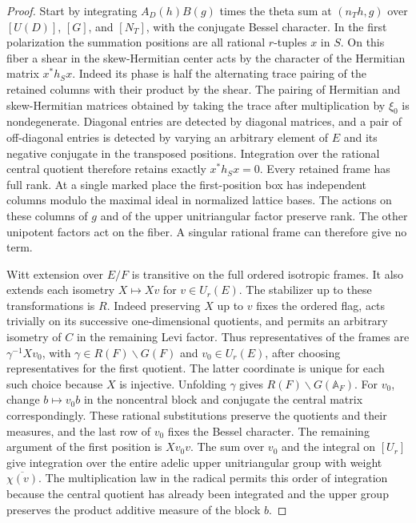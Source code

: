 \documentclass[a4paper,11pt]{article}
\theoremstyle{definition}
\theoremstyle{remark}
\numberwithin{equation}{section}
\begin{document}
\begin{proof}
Start by integrating \(A_D(h)B(g)\) times the theta sum at
\((n_T h,g)\) over \([U(D)]\), \([G]\), and \([N_T]\), with
the conjugate Bessel character. In the first polarization the
summation positions are all rational \(r\)-tuples \(x\) in
\(S\). On this fiber a shear in the skew-Hermitian center
acts by the character of the Hermitian matrix \(x^*h_Sx\).
Indeed its phase is half the alternating trace pairing of
the retained columns with their product by the shear.
The pairing of Hermitian and skew-Hermitian matrices obtained
by taking the trace after multiplication by \(\xi_0\) is
nondegenerate. Diagonal entries are detected by diagonal
matrices, and a pair of off-diagonal entries is detected by
varying an arbitrary element of \(E\) and its negative
conjugate in the transposed positions. Integration over the
rational central quotient therefore retains exactly
\(x^*h_Sx=0\). Every retained frame has full rank. At a single
marked place the first-position box has independent columns
modulo the maximal ideal in normalized lattice bases.
The actions on these columns of \(g\) and of the upper
unitriangular factor preserve rank. The other unipotent
factors act on the fiber. A singular rational frame can
therefore give no term.

Witt extension over \(E/F\) is transitive on the full ordered
isotropic frames. It also extends each isometry \(X\mapsto Xv\)
for \(v\in U_r(E)\). The stabilizer up to these transformations
is \(R\). Indeed preserving \(X\) up to \(v\) fixes the ordered flag,
acts trivially on its successive one-dimensional quotients,
and permits an arbitrary isometry of \(C\) in the remaining
Levi factor. Thus representatives of the frames are
\(\gamma^{-1}Xv_0\), with \(\gamma\in R(F)\backslash G(F)\)
and \(v_0\in U_r(E)\), after choosing representatives for the
first quotient. The latter coordinate is unique for each such
choice because \(X\) is injective. Unfolding \(\gamma\) gives
\(R(F)\backslash G(\mathbb A_F)\). For \(v_0\), change
\(b\mapsto v_0 b\) in the noncentral block and conjugate the
central matrix correspondingly. These rational substitutions
preserve the quotients and their measures, and the last row
of \(v_0\) fixes the Bessel character. The remaining argument
of the first position is \(Xv_0v\). The sum over \(v_0\) and
the integral on \([U_r]\) give integration over the entire
adelic upper unitriangular group with weight
\(\overline{\chi(v)}\). The multiplication law in the radical
permits this order of integration because the central quotient
has already been integrated and the upper group preserves
the product additive measure of the block \(b\).


\end{proof}
\end{document}
